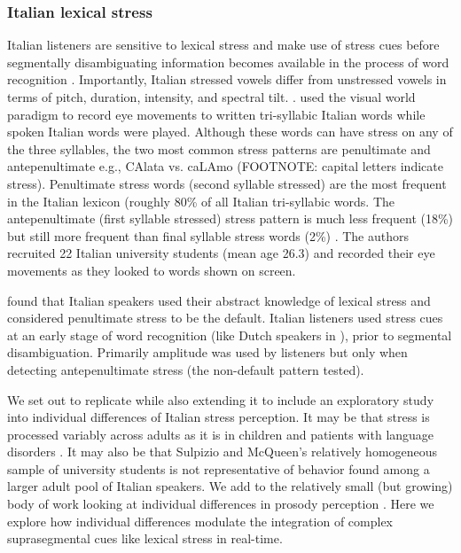 \subsubsection{Italian lexical stress}
Italian listeners are sensitive to lexical stress and make use of stress cues before segmentally disambiguating information becomes available in the process of word recognition \cite{Tagliapietra2005, Sulpizio_McQueen_2012}. Importantly, Italian stressed vowels differ from unstressed vowels in terms of pitch, duration, intensity, and spectral tilt. \citep{Maturi1998}. \cite{Sulpizio_McQueen_2012} used the visual world paradigm to record eye movements to written tri-syllabic Italian words while spoken Italian words were played. Although these words can have stress on any of the three syllables, the two most common stress patterns are penultimate and antepenultimate e.g., CAlata vs. caLAmo (FOOTNOTE: capital letters indicate stress). Penultimate stress words (second syllable stressed) are the most frequent in the Italian lexicon (roughly 80\% of all Italian tri-syllabic words. The antepenultimate (first syllable stressed) stress pattern is much less frequent (18\%) but still more frequent than final syllable stress words (2\%) \citep{thornton_1997}. The authors recruited 22 Italian university students (mean age 26.3) and recorded their eye movements as they looked to words shown on screen.

\cite{Sulpizio_McQueen_2012} found that Italian speakers used their abstract knowledge of lexical stress and considered penultimate stress to be the default. Italian listeners used stress cues at an early stage of word recognition (like Dutch speakers in \cite{Reinisch2010}), prior to segmental disambiguation. Primarily amplitude was used by listeners but only when detecting antepenultimate stress (the non-default pattern tested). 

We set out to replicate \cite{Sulpizio_McQueen_2012}  while also extending it to include an exploratory study into individual differences of Italian stress perception. It may be that stress is processed variably across adults as it is in children \citep[e.g.,][]{Colombo2014} and patients with language disorders \citep[e.g.,][]{Cappa1997}. It may also be that Sulpizio and McQueen's relatively homogeneous sample of university students is not representative of behavior found among a larger adult pool of Italian speakers. We add to the relatively small (but growing) body of work looking at individual differences in prosody perception \citep[e.g.,][]{Roy2017,Bishop2017,Lameris2023}. Here we explore how individual differences modulate the integration of complex suprasegmental cues like lexical stress in real-time.


